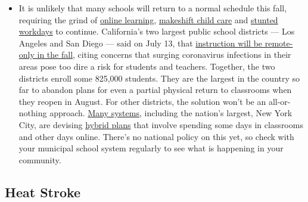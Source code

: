 \begin{itemize}
  \begin{itemize}
  \tightlist
  \item
    It is unlikely that many schools will return to a normal schedule
    this fall, requiring the grind of
    \href{https://www.nytimes3xbfgragh.onion/2020/06/05/us/coronavirus-education-lost-learning.html?action=click\&pgtype=Article\&state=default\&region=MAIN_CONTENT_3\&context=storylines_faq}{online
    learning},
    \href{https://www.nytimes3xbfgragh.onion/2020/05/29/us/coronavirus-child-care-centers.html?action=click\&pgtype=Article\&state=default\&region=MAIN_CONTENT_3\&context=storylines_faq}{makeshift
    child care} and
    \href{https://www.nytimes3xbfgragh.onion/2020/06/03/business/economy/coronavirus-working-women.html?action=click\&pgtype=Article\&state=default\&region=MAIN_CONTENT_3\&context=storylines_faq}{stunted
    workdays} to continue. California's two largest public school
    districts --- Los Angeles and San Diego --- said on July 13, that
    \href{https://www.nytimes3xbfgragh.onion/2020/07/13/us/lausd-san-diego-school-reopening.html?action=click\&pgtype=Article\&state=default\&region=MAIN_CONTENT_3\&context=storylines_faq}{instruction
    will be remote-only in the fall}, citing concerns that surging
    coronavirus infections in their areas pose too dire a risk for
    students and teachers. Together, the two districts enroll some
    825,000 students. They are the largest in the country so far to
    abandon plans for even a partial physical return to classrooms when
    they reopen in August. For other districts, the solution won't be an
    all-or-nothing approach.
    \href{https://bioethics.jhu.edu/research-and-outreach/projects/eschool-initiative/school-policy-tracker/}{Many
    systems}, including the nation's largest, New York City, are
    devising
    \href{https://www.nytimes3xbfgragh.onion/2020/06/26/us/coronavirus-schools-reopen-fall.html?action=click\&pgtype=Article\&state=default\&region=MAIN_CONTENT_3\&context=storylines_faq}{hybrid
    plans} that involve spending some days in classrooms and other days
    online. There's no national policy on this yet, so check with your
    municipal school system regularly to see what is happening in your
    community.
  \end{itemize}
\end{itemize}

\hypertarget{heat-stroke}{%
\subsection{Heat Stroke}\label{heat-stroke}}

